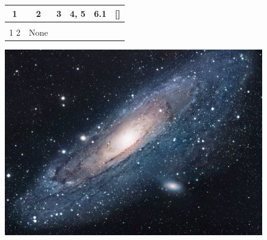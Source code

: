 \documentclass{article}
\begin{document}
\begin{center}
\begin{tabular}{ |c|c|c|c|c|c| }
\hline
1 & 2 & 3 & 4, 5 & 6.1 & [] \\
\hline
 &  &  &  &  &  \\
\hline
1
2 & None &  &  &  &  \\
\hline
\end{tabular}

\includegraphics[scale=1.0]{artifacts/universe.jpg}
\end{center}
\end{document}
